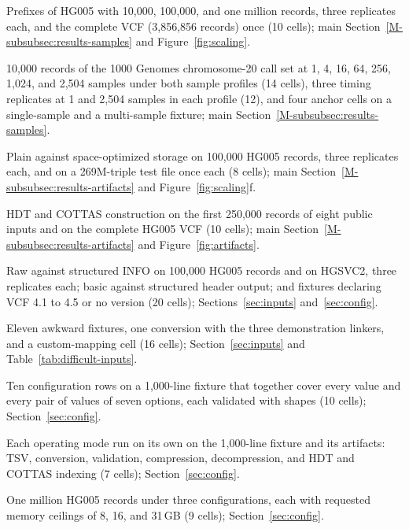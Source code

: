 \documentclass[11pt]{article}
\begin{document}
\begin{description}\setlength{\itemsep}{1pt}
\item[Records scaling (\texttt{04}).] Prefixes of HG005 with 10,000, 100,000, and one million records, three replicates each, and the complete VCF (3,856,856 records) once (10 cells); main Section~\ref{M-subsubsec:results-samples} and Figure~\ref{fig:scaling}.
\item[Sample representation (\texttt{03}).] 10,000 records of the 1000 Genomes chromosome-20 call set at 1, 4, 16, 64, 256, 1,024, and 2,504 samples under both sample profiles (14 cells), three timing replicates at 1 and 2,504 samples in each profile (12), and four anchor cells on a single-sample and a multi-sample fixture; main Section~\ref{M-subsubsec:results-samples}.
\item[Storage mode (\texttt{01}).] Plain against space-optimized storage on 100,000 HG005 records, three replicates each, and on a 269M-triple test file once each (8 cells); main Section~\ref{M-subsubsec:results-artifacts} and Figure~\ref{fig:scaling}f.
\item[Corpus breadth (\texttt{05}).] HDT and COTTAS construction on the first 250,000 records of eight public inputs and on the complete HG005 VCF (10 cells); main Section~\ref{M-subsubsec:results-artifacts} and Figure~\ref{fig:artifacts}.
\item[Representation axes (\texttt{07}).] Raw against structured INFO on 100,000 HG005 records and on HGSVC2, three replicates each; basic against structured header output; and fixtures declaring VCF 4.1 to 4.5 or no version (20 cells); Sections~\ref{sec:inputs} and~\ref{sec:config}.
\item[Difficult inputs (\texttt{09}).] Eleven awkward fixtures, one conversion with the three demonstration linkers, and a custom-mapping cell (16 cells); Section~\ref{sec:inputs} and Table~\ref{tab:difficult-inputs}.
\item[Covering set (\texttt{11}).] Ten configuration rows on a 1,000-line fixture that together cover every value and every pair of values of seven options, each validated with shapes (10 cells); Section~\ref{sec:config}.
\item[Modes (\texttt{12}).] Each operating mode run on its own on the 1,000-line fixture and its artifacts: TSV, conversion, validation, compression, decompression, and HDT and COTTAS indexing (7 cells); Section~\ref{sec:config}.
\item[Feasibility (\texttt{10}).] One million HG005 records under three configurations, each with requested memory ceilings of 8, 16, and 31\,GB (9 cells); Section~\ref{sec:config}.

\end{description}
\end{document}

